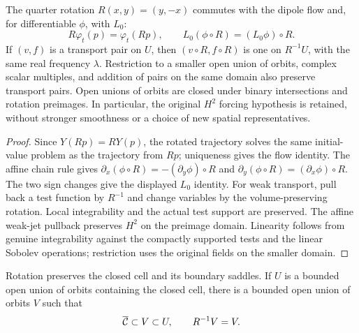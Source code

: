 \begin{lemma}
\label{lem:transport-pair-rotation}
\leanok
The quarter rotation $R(x,y)=(y,-x)$ commutes with the dipole flow and,
for differentiable $\phi$, with $L_0$:
\[
 R\varphi_t(p)=\varphi_t(Rp),\qquad
 L_0(\phi\circ R)=(L_0\phi)\circ R.
\]
If $(v,f)$ is a transport pair on $U$, then $(v\circ R,f\circ R)$ is
one on $R^{-1}U$, with the same real frequency $\lambda$.
Restriction to a smaller open union of orbits, complex scalar multiples,
and addition of pairs on the same domain also preserve transport pairs.
Open unions of orbits are closed under binary intersections and rotation
preimages. In particular, the original $H^2$ forcing hypothesis is retained,
without stronger smoothness or a choice of new spatial representatives.
\end{lemma}

\begin{proof}
\leanok
Since $Y(Rp)=RY(p)$, the rotated trajectory solves the same initial-value
problem as the trajectory from $Rp$; uniqueness gives the flow identity.
The affine chain rule gives
$\partial_x(\phi\circ R)=-(\partial_y\phi)\circ R$ and
$\partial_y(\phi\circ R)=(\partial_x\phi)\circ R$.
The two sign changes give the displayed $L_0$ identity.
For weak transport, pull back a test function by $R^{-1}$ and change
variables by the volume-preserving rotation. Local integrability and the
actual test support are preserved. The affine weak-jet pullback preserves
$H^2$ on the preimage domain. Linearity follows from genuine integrability
against the compactly supported tests and the linear Sobolev operations;
restriction uses the original fields on the smaller domain.
\end{proof}

\begin{lemma}
\label{lem:transport-rotation-neighbourhood}
\leanok
Rotation preserves the closed cell and its boundary saddles.
If $U$ is a bounded open union of orbits containing the closed cell,
there is a bounded open union of orbits $V$ such that
\[
 \overline{\mathcal{C}}\subset V\subset U,\qquad R^{-1}V=V.
\]
\end{lemma}

